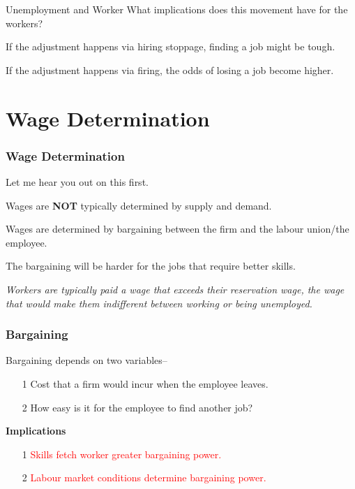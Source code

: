 \documentclass[shownotes,11pt, aspectratio=169]{beamer}
\newenvironment{wideitemize}{\itemize\addtolength{\itemsep}{10pt}}{\enditemize}
\begin{document}
\begin{frame}{Unemployment and Worker}
What implications does this movement have for the workers?
\begin{wideitemize}
\item If the adjustment happens via hiring stoppage, finding a job might be tough.
\item If the adjustment happens via firing, the odds of losing a job become higher.
\end{wideitemize}
\end{frame}

\section{Wage Determination}
\begin{frame}
\frametitle{Wage Determination}
\begin{wideitemize}
\item Let me hear you out on this first.
\pause
\item Wages are \textbf{NOT} typically determined by supply and demand.
\pause
\item Wages are determined by bargaining between the firm and the labour union/the employee.
\item The bargaining will be harder for \pause the jobs that require better skills.
\pause
\item \textit{Workers are typically paid a wage that exceeds their reservation wage, the wage
that would make them indifferent between working or being unemployed.}
\end{wideitemize}
\end{frame}

\begin{frame}
\frametitle{Bargaining}
Bargaining depends on two variables--
\begin{itemize}
\item[1] Cost that a firm would incur when the employee leaves.
\item[2] How easy is it for the employee to find another job?
\end{itemize}
\pause
\textbf{Implications}
\begin{itemize}
\item[1] \textcolor{red}{Skills fetch worker greater bargaining power.}
\item[2] \textcolor{red}{Labour market conditions determine bargaining power.}
\end{itemize}
\end{frame}
\end{document}
